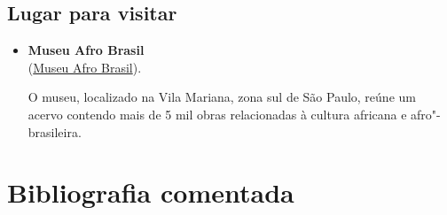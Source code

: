 \documentclass[11pt]{extarticle}
\begin{document}
\subsection{Lugar para visitar}

\begin{itemize}
\item\textbf{Museu Afro Brasil}\\
(\href{http://www.museuafrobrasil.org.br/}{Museu Afro Brasil}).

O museu, localizado na Vila Mariana, zona sul de São Paulo, reúne um
acervo contendo mais de 5 mil obras relacionadas à cultura africana e
afro"-brasileira.
\end{itemize}

\section{Bibliografia comentada}
\end{document}
